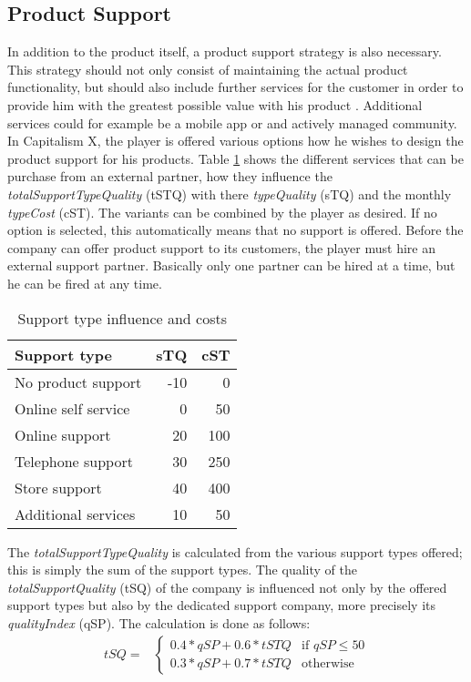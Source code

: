 \subsection{Product Support}  \label{product_support_simulation}

In addition to the product itself, a product support strategy is also necessary. This strategy should not only consist of maintaining the actual product functionality, but should also include further services for the customer in order to provide him with the greatest possible value with his product \cite{markeset_design_2003}. Additional services could for example be a mobile app or and actively managed community.  
In Capitalism X, the player is offered various options how he wishes to design the product support for his products. Table \ref{Support_types} shows the different services that can be purchase from an external partner, how they influence the \textit{totalSupportTypeQuality} (\gls{tSTQ}) with there \textit{typeQuality} (\gls{sTQ}) and the monthly \textit{typeCost} (\gls{cST}). The variants can be combined by the player as desired. If no option is selected, this automatically means that no support is offered.
Before the company can offer product support to its customers, the player must hire an external support partner. Basically only one partner can be hired at a time, but he can be fired at any time.

\begin{table}[ht]
    \centering
    \begin{tabular}{|l|r|r|}
    \hline
    Support type & sTQ & cST \\
    \hline
    No product support   & -10   & 0    \\
    Online self service  & 0     & 50   \\
    Online support       & 20    & 100  \\
    Telephone support    & 30    & 250  \\
    Store support        & 40    & 400  \\
    Additional services  & 10    & 50   \\     
    \hline
    \end{tabular}
    \caption{Support type influence and costs}
    \label{Support_types}
\end{table}

The \textit{totalSupportTypeQuality} is calculated from the various support types offered; this is simply the sum of the support types. The quality of the \textit{totalSupportQuality} (\gls{tSQ}) of the company is influenced not only by the offered support types but also by the dedicated support company, more precisely its \textit{qualityIndex} (\gls{qSP}). The calculation is done as follows:
\begin{equation}
\label{func:totalProductSupport}
\begin{aligned}
    tSQ = &
    \begin{cases}
        0.4 *qSP + 0.6 * tSTQ & \text{if } qSP \leq  50\\
        0.3 * qSP + 0.7 * tSTQ & \text{otherwise}
    \end{cases}
\end{aligned}
\end{equation}

